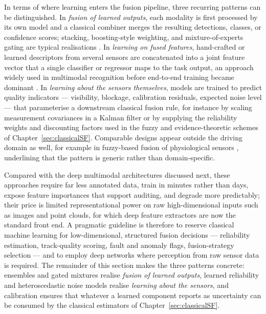 In terms of where learning enters the fusion pipeline, three recurring patterns can be distinguished. In \emph{fusion of learned outputs}, each modality is first processed by its own model and a classical combiner merges the resulting detections, classes, or confidence scores; stacking, boosting-style weighting, and mixture-of-experts gating are typical realisations \cite{breiman2001_rf,khaleghi_multisensor_2013}. In \emph{learning on fused features}, hand-crafted or learned descriptors from several sensors are concatenated into a joint feature vector that a single classifier or regressor maps to the task output, an approach widely used in multimodal recognition before end-to-end training became dominant \cite{atrey_multimodal_2010,gao_survey_2020}. In \emph{learning about the sensors themselves}, models are trained to predict quality indicators --- visibility, blockage, calibration residuals, expected noise level --- that parameterise a downstream classical fusion rule, for instance by scaling measurement covariances in a Kalman filter or by supplying the reliability weights and discounting factors used in the fuzzy and evidence-theoretic schemes of Chapter~\ref{sec:classicalSF}. Comparable designs appear outside the driving domain as well, for example in fuzzy-based fusion of physiological sensors \cite{testa_fuzzyfusion_2025}, underlining that the pattern is generic rather than domain-specific.

Compared with the deep multimodal architectures discussed next, these approaches require far less annotated data, train in minutes rather than days, expose feature importances that support auditing, and degrade more predictably; their price is limited representational power on raw high-dimensional inputs such as images and point clouds, for which deep feature extractors \cite{guo_deep_2019} are now the standard front end. A pragmatic guideline is therefore to reserve classical machine learning for low-dimensional, structured fusion decisions --- reliability estimation, track-quality scoring, fault and anomaly flags, fusion-strategy selection --- and to employ deep networks where perception from raw sensor data is required.
The remainder of this section makes the three patterns concrete: ensembles and gated mixtures realise \emph{fusion of learned outputs}, learned reliability and heteroscedastic noise models realise \emph{learning about the sensors}, and calibration ensures that whatever a learned component reports as uncertainty can be consumed by the classical estimators of Chapter~\ref{sec:classicalSF}.

